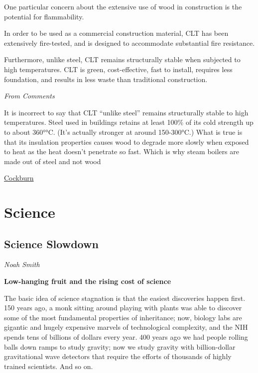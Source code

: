 \documentclass[
]{book}
\begin{document}
One particular concern about the extensive use of wood in construction is the potential for flammability.

In order to be used as a commercial construction material, CLT has been extensively fire-tested, and is designed to accommodate substantial fire resistance.

Furthermore, unlike steel, CLT remains structurally stable when subjected to high temperatures.
CLT is green, cost-effective, fast to install, requires less foundation, and results in less waste than traditional construction.

\emph{From Comments}

It is incorrect to say that CLT ``unlike steel'' remains structurally stable to high temperatures. Steel used in buildings retains at least 100\% of its cold strength up to about 360°°C. (It's actually stronger at around 150-300°C.) What is true is that its insulation properties causes wood to degrade more slowly when exposed to heat as the heat doesn't penetrate so fast. Which is why steam boilers are made out of steel and not wood

\href{https://www.independent.co.uk/climate-change/news/wood-construction-concrete-steel-climate-b1796342.html}{Cockburn}

\hypertarget{science}{%
\chapter{Science}\label{science}}

\hypertarget{science-slowdown}{%
\section{Science Slowdown}\label{science-slowdown}}

\emph{Noah Smith}

\textbf{Low-hanging fruit and the rising cost of science}

The basic idea of science stagnation is that the easiest discoveries happen first. 150 years ago, a monk sitting around playing with plants was able to discover some of the most fundamental properties of inheritance; now, biology labs are gigantic and hugely expensive marvels of technological complexity, and the NIH spends tens of billions of dollars every year. 400 years ago we had people rolling balls down ramps to study gravity; now we study gravity with billion-dollar gravitational wave detectors that require the efforts of thousands of highly trained scientists. And so on.
\end{document}
